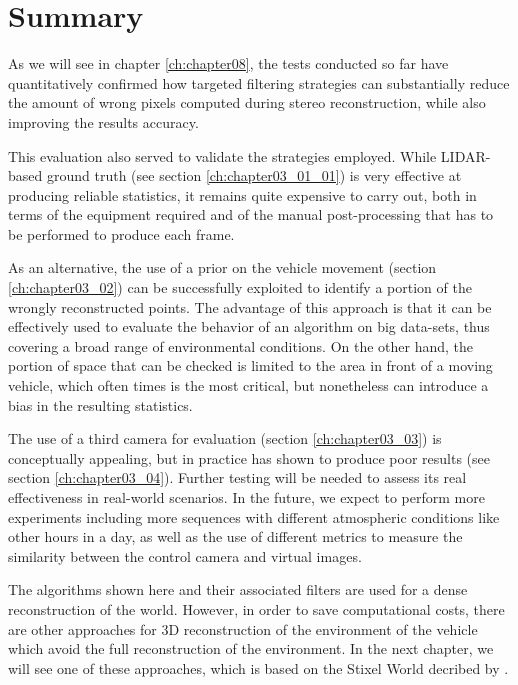 \section{Summary}\label{ch:chapter03_05}

As we will see in chapter \ref{ch:chapter08}, the tests conducted so far have quantitatively confirmed how targeted filtering strategies can substantially reduce the amount of wrong pixels computed during stereo reconstruction, while also improving the results accuracy.

This evaluation also served to validate the strategies employed. While LIDAR-based ground truth (see section \ref{ch:chapter03_01_01}) is very effective at producing reliable statistics, it remains quite expensive to carry out, both in terms of the equipment required and of the manual post-processing that has to be performed to produce each frame.

As an alternative, the use of a prior on the vehicle movement (section \ref{ch:chapter03_02}) can be successfully exploited to identify a portion of the wrongly reconstructed points. The advantage of this approach is that it can be effectively used to evaluate the behavior of an algorithm on big data-sets, thus covering a broad range of environmental conditions. On the other hand, the portion of space that can be checked is limited to the area in front of a moving vehicle, which often times is the most critical, but nonetheless can introduce a bias in the resulting statistics.

The use of a third camera for evaluation (section \ref{ch:chapter03_03}) is conceptually appealing, but in practice has shown to produce poor results (see section \ref{ch:chapter03_04}). Further testing will be needed to assess its real effectiveness in real-world scenarios. In the future, we expect to perform more experiments including more sequences with different atmospheric conditions like other hours in a day, as well as the use of different metrics to measure the similarity between the control camera and virtual images.

The algorithms shown here and their associated filters are used for a dense reconstruction of the world. However, in order to save computational costs, there are other approaches for 3D reconstruction of the environment of the vehicle which avoid the full reconstruction of the environment. In the next chapter, we will see one of these approaches, which is based on the Stixel World decribed by \cite{badino2009stixel}.
